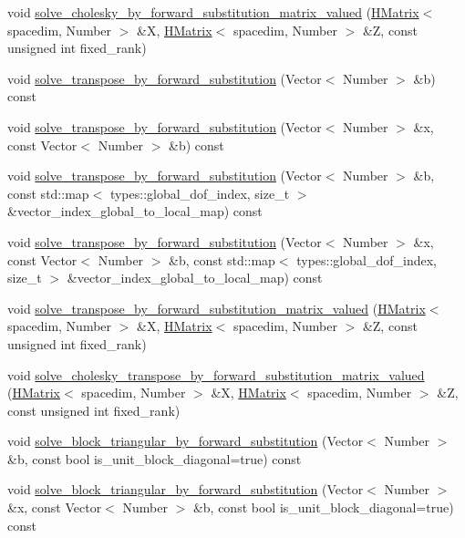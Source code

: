 \begin{DoxyCompactItemize}
\item 
void \hyperlink{classHMatrix_a948b0b53490cc7614ee82fec80fa245a}{solve\+\_\+cholesky\+\_\+by\+\_\+forward\+\_\+substitution\+\_\+matrix\+\_\+valued} (\hyperlink{classHMatrix}{H\+Matrix}$<$ spacedim, Number $>$ \&X, \hyperlink{classHMatrix}{H\+Matrix}$<$ spacedim, Number $>$ \&Z, const unsigned int fixed\+\_\+rank)
\item 
void \hyperlink{classHMatrix_a624fc153099a20572a655457d4f81b70}{solve\+\_\+transpose\+\_\+by\+\_\+forward\+\_\+substitution} (Vector$<$ Number $>$ \&b) const
\item 
void \hyperlink{classHMatrix_a94f9bb1bc4e584fc5f29541be6b85ef1}{solve\+\_\+transpose\+\_\+by\+\_\+forward\+\_\+substitution} (Vector$<$ Number $>$ \&x, const Vector$<$ Number $>$ \&b) const
\item 
void \hyperlink{classHMatrix_aefa73f541d0b5eb8cddde5386fd140d0}{solve\+\_\+transpose\+\_\+by\+\_\+forward\+\_\+substitution} (Vector$<$ Number $>$ \&b, const std\+::map$<$ types\+::global\+\_\+dof\+\_\+index, size\+\_\+t $>$ \&vector\+\_\+index\+\_\+global\+\_\+to\+\_\+local\+\_\+map) const
\item 
void \hyperlink{classHMatrix_a8e9c993ce276353fda2bfefd0b932670}{solve\+\_\+transpose\+\_\+by\+\_\+forward\+\_\+substitution} (Vector$<$ Number $>$ \&x, const Vector$<$ Number $>$ \&b, const std\+::map$<$ types\+::global\+\_\+dof\+\_\+index, size\+\_\+t $>$ \&vector\+\_\+index\+\_\+global\+\_\+to\+\_\+local\+\_\+map) const
\item 
void \hyperlink{classHMatrix_a469507ef4061efcc29a65c413ac7acea}{solve\+\_\+transpose\+\_\+by\+\_\+forward\+\_\+substitution\+\_\+matrix\+\_\+valued} (\hyperlink{classHMatrix}{H\+Matrix}$<$ spacedim, Number $>$ \&X, \hyperlink{classHMatrix}{H\+Matrix}$<$ spacedim, Number $>$ \&Z, const unsigned int fixed\+\_\+rank)
\item 
void \hyperlink{classHMatrix_a41f0e0b791e50a3d9b5c0e73ee4423c6}{solve\+\_\+cholesky\+\_\+transpose\+\_\+by\+\_\+forward\+\_\+substitution\+\_\+matrix\+\_\+valued} (\hyperlink{classHMatrix}{H\+Matrix}$<$ spacedim, Number $>$ \&X, \hyperlink{classHMatrix}{H\+Matrix}$<$ spacedim, Number $>$ \&Z, const unsigned int fixed\+\_\+rank)
\item 
void \hyperlink{classHMatrix_ab8b64d4a5b7120a2599ec3e3e0708775}{solve\+\_\+block\+\_\+triangular\+\_\+by\+\_\+forward\+\_\+substitution} (Vector$<$ Number $>$ \&b, const bool is\+\_\+unit\+\_\+block\+\_\+diagonal=true) const
\item 
void \hyperlink{classHMatrix_aa8046a87be454c81d4a884b53150685a}{solve\+\_\+block\+\_\+triangular\+\_\+by\+\_\+forward\+\_\+substitution} (Vector$<$ Number $>$ \&x, const Vector$<$ Number $>$ \&b, const bool is\+\_\+unit\+\_\+block\+\_\+diagonal=true) const

\end{DoxyCompactItemize}
